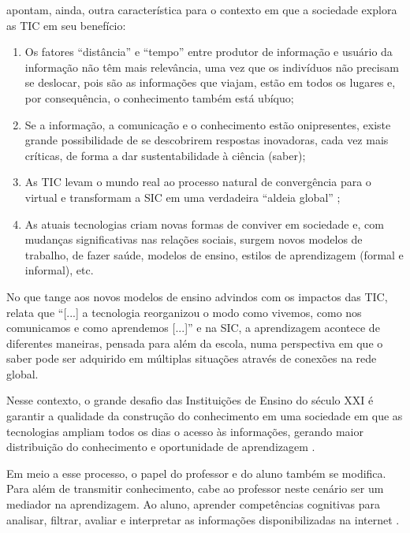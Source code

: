 \documentclass[portuguese]{textolivre}
\begin{document}
\textcite{takahashi2000,hargreaves2003} apontam, ainda, outra
característica para o contexto em que a sociedade explora as TIC em seu
benefício:

\begin{enumerate}
\def\labelenumi{\alph{enumi})}
\item
  Os fatores ``distância'' e ``tempo'' entre produtor de informação e
  usuário da informação não têm mais relevância, uma vez
  que os  indivíduos não precisam se deslocar, pois são as
  informações que  viajam, estão em todos os lugares e,
  por consequência, o  conhecimento também está ubíquo;
\item
  Se a informação, a comunicação e o conhecimento estão onipresentes,
  existe grande possibilidade de se descobrirem respostas
  inovadoras, cada vez mais críticas, de forma a dar
  sustentabilidade à ciência (saber);
\item
  As TIC levam o mundo real ao processo natural de convergência para o
  virtual \cite{levy2011} e transformam a SIC em uma
  verdadeira ``aldeia  global'' \cite{mcluhan1990};
\item
  As atuais tecnologias criam novas formas de conviver em sociedade e,
  com mudanças significativas nas relações sociais,
  surgem novos  modelos de trabalho, de fazer saúde,
  modelos de ensino, estilos de  aprendizagem (formal e
  informal), etc.
\end{enumerate}

No que tange aos novos modelos de ensino advindos com os impactos das
TIC, \textcite[p.~1]{siemens2004} relata que ``{[}...{]} a tecnologia
reorganizou o modo como vivemos, como nos comunicamos e como aprendemos
{[}...{]}'' e na SIC, a aprendizagem acontece de diferentes maneiras,
pensada para além da escola, numa perspectiva em que o saber pode ser
adquirido em múltiplas situações através de conexões na rede global.

Nesse contexto, o grande desafio das Instituições de Ensino do século
XXI é garantir a qualidade da construção do conhecimento em uma
sociedade em que as tecnologias ampliam todos os dias o acesso às
informações, gerando maior distribuição do conhecimento e oportunidade
de aprendizagem \cite{siemens2004,siemens2010}.

Em meio a esse processo, o papel do professor e do aluno também se
modifica. Para além de transmitir conhecimento, cabe ao professor neste
cenário ser um mediador na aprendizagem. Ao aluno, aprender competências
cognitivas para analisar, filtrar, avaliar e interpretar as informações
disponibilizadas na internet \cite{takahashi2000, coutinho2011}.
\end{document}

